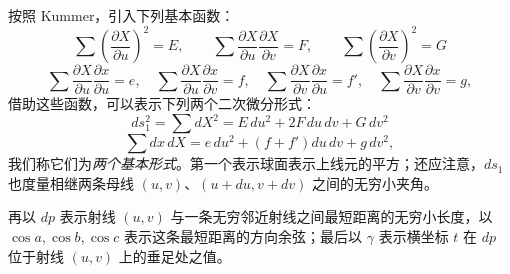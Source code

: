 按照 Kummer，引入下列基本函数：
\begin{equation}\tag{2}
 \sum\left(\frac{\partial X}{\partial u}\right)^2=E,
 \qquad
 \sum\frac{\partial X}{\partial u}\frac{\partial X}{\partial v}=F,
 \qquad
 \sum\left(\frac{\partial X}{\partial v}\right)^2=G
\end{equation}
\begin{equation}\tag{3}
 \sum\frac{\partial X}{\partial u}\frac{\partial x}{\partial u}=e,
 \quad
 \sum\frac{\partial X}{\partial u}\frac{\partial x}{\partial v}=f,
 \quad
 \sum\frac{\partial X}{\partial v}\frac{\partial x}{\partial u}=f',
 \quad
 \sum\frac{\partial X}{\partial v}\frac{\partial x}{\partial v}=g,
\end{equation}
借助这些函数，可以表示下列两个二次微分形式：
\begin{equation}\tag{4}
 ds_1^2=\sum dX^2=E\,du^2+2F\,du\,dv+G\,dv^2
\end{equation}
\begin{equation}\tag{5}
 \sum dx\,dX=e\,du^2+(f+f')du\,dv+g\,dv^2,
\end{equation}
我们称它们为\emph{两个基本形式}。第一个表示球面表示上线元的平方；还应注意，\(ds_1\) 也度量相继两条母线 \((u,v)\)、\((u+du,v+dv)\) 之间的无穷小夹角。

再以 \(dp\) 表示射线 \((u,v)\) 与一条无穷邻近射线之间最短距离的无穷小长度，以 \(\cos a,\cos b,\cos c\) 表示这条最短距离的方向余弦；最后以 \(\gamma\) 表示横坐标 \(t\) 在 \(dp\) 位于射线 \((u,v)\) 上的垂足处之值。

